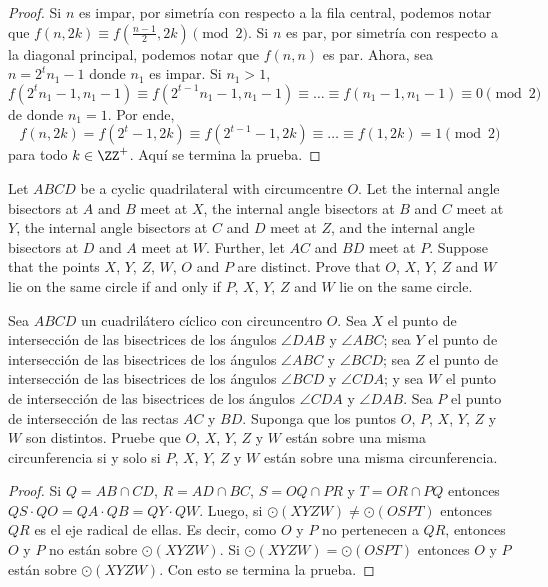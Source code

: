 \begin{proof}
	Si $n$ es impar, por simetría con respecto a la fila central, podemos notar que $f(n,2k)\equiv f(\frac{n-1}{2},2k)\pmod 2$. Si $n$ es par, por simetría con respecto a la diagonal principal, podemos notar que $f(n,n)$ es par. Ahora, sea $n=2^tn_1-1$ donde $n_1$ es impar. Si $n_1>1$,
	\[f(2^tn_1-1,n_1-1)\equiv f(2^{t-1}n_1-1,n_1-1)\equiv\dots\equiv f(n_1-1,n_1-1)\equiv 0\pmod 2\]
	de donde $n_1=1$. Por ende,
	\[f(n,2k)=f(2^t-1,2k)\equiv f(2^{t-1}-1,2k)\equiv\dots\equiv f(1,2k)=1\pmod 2\]
	para todo $k\in\ZZ^+$. Aquí se termina la prueba.
\end{proof}

\begin{probEG}[EGMO 2022/6]
	Let $ABCD$ be a cyclic quadrilateral with circumcentre $O$. Let the internal angle bisectors at $A$ and $B$ meet at $X$, the internal angle bisectors at $B$ and $C$ meet at $Y$, the internal angle bisectors at $C$ and $D$ meet at $Z$, and the internal angle bisectors at $D$ and $A$ meet at $W$. Further, let $AC$ and $BD$ meet at $P$. Suppose that the points $X$, $Y$, $Z$, $W$, $O$ and $P$ are distinct. Prove that $O$, $X$, $Y$, $Z$ and $W$ lie on the same circle if and only if $P$, $X$, $Y$, $Z$ and $W$ lie on the same circle.
	\begin{probSP}
		Sea $ABCD$ un cuadrilátero cíclico con circuncentro $O$. Sea $X$ el punto de intersección de las bisectrices de los ángulos $\angle DAB$ y $\angle ABC$; sea $Y$ el punto de intersección de las bisectrices de los ángulos $\angle ABC$ y $\angle BCD$; sea $Z$ el punto de intersección de las bisectrices de los ángulos $\angle BCD$ y $\angle CDA$; y sea $W$ el punto de intersección de las bisectrices de los ángulos $\angle CDA$ y $\angle DAB$. Sea $P$ el punto de intersección de las rectas $AC$ y $BD$. Suponga que los puntos $O$, $P$, $X$, $Y$, $Z$ y $W$ son distintos. Pruebe que $O$, $X$, $Y$, $Z$ y $W$ están sobre una misma circunferencia si y solo si $P$, $X$, $Y$, $Z$ y $W$ están sobre una misma circunferencia.
	\end{probSP}
\end{probEG}

\begin{proof}
	Si $Q=AB\cap CD$, $R=AD\cap BC$, $S=OQ\cap PR$ y $T=OR\cap PQ$ entonces $QS\cdot QO=QA\cdot QB=QY\cdot QW$. Luego, si $\odot(XYZW)\neq\odot(OSPT)$ entonces $QR$ es el eje radical de ellas. Es decir, como $O$ y $P$ no pertenecen a $QR$, entonces $O$ y $P$ no están sobre $\odot(XYZW)$. Si $\odot(XYZW)=\odot(OSPT)$ entonces $O$ y $P$ están sobre $\odot(XYZW)$. Con esto se termina la prueba.
\end{proof}
